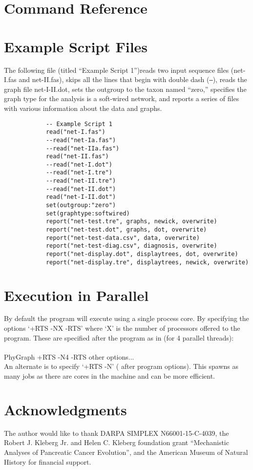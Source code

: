 \documentclass[11pt]{book}
\begin{document}

	\section{Command Reference}
	
	
	\section{Example Script Files}
	The following file (titled ``Example Script 1'')reads two input sequence files (net-I.fas and net-II.fas), skips all 
	the lines that begin with double dash (\texttt{--}), reads the graph file net-I-II.dot, sets the outgroup to the taxon 
	named ``zero,'' specifies the graph type for the analysis is a soft-wired network, and 	reports a series of files 
	with various information about the data and graphs.
	
		\begin{verbatim}
			-- Example Script 1
			read("net-I.fas")
			--read("net-Ia.fas")
			--read("net-IIa.fas")
			read("net-II.fas")
			--read("net-I.dot")
			--read("net-I.tre")
			--read("net-II.tre")
			--read("net-II.dot")
			read("net-I-II.dot")
			set(outgroup:"zero")
			set(graphtype:softwired)
			report("net-test.tre", graphs, newick, overwrite)
			report("net-test.dot", graphs, dot, overwrite)
			report("net-test-data.csv", data, overwrite)
			report("net-test-diag.csv", diagnosis, overwrite)
			report("net-display.dot", displaytrees, dot, overwrite)
			report("net-display.tre", displaytrees, newick, overwrite)
		\end{verbatim}
		
	\section{Execution in Parallel}
	By default the program will execute using a single process core.  By specifying the options `+RTS -NX -RTS' where `X' is the number of processors offered to the program. These are specified after the program as in (for 4 parallel threads):\\
	\\
	PhyGraph +RTS -N4 -RTS other options...  \\
	
	An alternate is to specify `+RTS -N' ( after program options).  This spawns as many jobs as there are cores in the machine and can be more efficient.
	
	\section*{Acknowledgments}
	The author would like to thank DARPA SIMPLEX N66001-15-C-4039, the  Robert J. Kleberg Jr. and Helen C. Kleberg foundation grant ``Mechanistic Analyses of Pancreatic Cancer Evolution'', and the American Museum of Natural History for financial support.  
	
	\newpage
	
 
\end{document}
